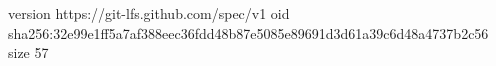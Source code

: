version https://git-lfs.github.com/spec/v1
oid sha256:32e99e1ff5a7af388eec36fdd48b87e5085e89691d3d61a39c6d48a4737b2c56
size 57
